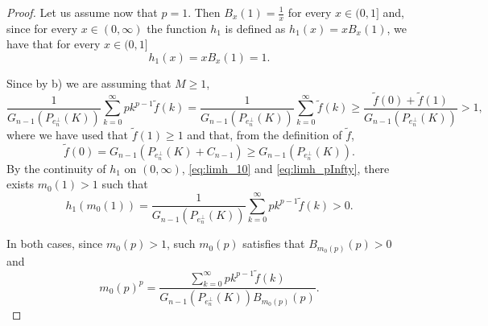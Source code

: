 \documentclass[10pt]{amsart}
\numberwithin{equation}{section}
\begin{document}
\begin{proof}
Let us assume now that $p=1$. Then $B_x(1)=\frac{1}{x}$ for every $x\in (0,1]$ and, since for every $x\in(0,\infty)$ the function $h_1$ is defined as $h_1(x)=xB_x(1)$, we have that for every $x\in (0,1]$
\begin{equation}\label{eq:limh_10}
h_1(x)=xB_x(1)=1.
\end{equation}

Since by b) we are assuming that $M\geq1$,
$$
\frac{1}{G_{n-1}(P_{e_n^\perp}(K))}\sum_{k=0}^{\infty}pk^{p-1}\tilde{f}(k)=\frac{1}{G_{n-1}(P_{e_n^\perp}(K))}\sum_{k=0}^{\infty}\tilde{f}(k)\geq\frac{\tilde{f}(0)+\tilde{f}(1)}{G_{n-1}(P_{e_n^\perp}(K))}>1,
$$
where we have used that  $\tilde{f}(1)\geq1$ and that, from the definition of $\tilde{f}$,
$$
\tilde{f}(0)=G_{n-1}(P_{e_n^\perp}(K)+C_{n-1})\geq G_{n-1}(P_{e_n^\perp}(K)).
$$
By the continuity of $h_1$ on $(0,\infty)$, \eqref{eq:limh_10} and \eqref{eq:limh_pInfty}, there exists $m_0(1)>1$ such that
$$
h_1(m_0(1))=\frac{1}{G_{n-1}(P_{e_n^\perp}(K))}\sum_{k=0}^{\infty}pk^{p-1}\tilde{f}(k)>0.
$$


In both cases, since $m_0(p)>1$, such $m_0(p)$ satisfies that $B_{m_0(p)}(p)>0$ and
$$
m_0(p)^p=\frac{\sum_{k=0}^{\infty}pk^{p-1}\tilde{f}(k)}{G_{n-1}(P_{e_n^\perp}(K))B_{m_0(p)}(p)}.%
$$


\end{proof}
\end{document}
